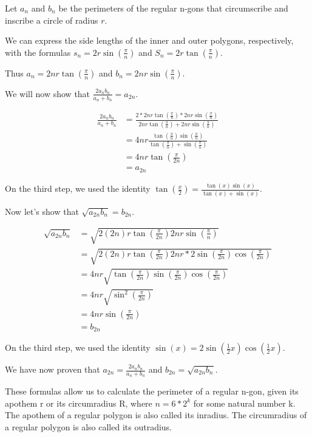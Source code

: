 Let $a_n$ and $b_n$ be the perimeters of the regular n-gons that circumscribe and inscribe a circle of radius $r$.

We can express the side lengths of the inner and outer polygons, respectively, with the formulas $s_n=2r\sin(\frac{\pi}{n})$ and $S_n = 2r\tan(\frac{\pi}{n})$.

Thus $a_n = 2nr\tan(\frac{\pi}{n})$ and $b_n = 2nr\sin(\frac{\pi}{n})$.

We will now show that $\frac{2a_nb_n}{a_n + b_n} = a_{2n}$.

\begin{align*}
\frac{2a_nb_n}{a_n + b_n} &= \frac{2*2nr\tan(\frac{\pi}{n})*2nr\sin(\frac{\pi}{n})}{2nr\tan(\frac{\pi}{n}) + 2nr\sin(\frac{\pi}{n})} \\
&= 4nr \frac{\tan(\frac{\pi}{n})\sin(\frac{\pi}{n})}{\tan(\frac{\pi}{n}) + \sin(\frac{\pi}{n})} \\
&= 4nr \tan(\frac{\pi}{2n}) \\
&= a_{2n}
\end{align*}

On the third step, we used the identity $\tan(\frac{x}{2}) = \frac{\tan(x)\sin(x)}{\tan(x) + \sin(x)}$.

Now let's show that $\sqrt{a_{2n}b_n} = b_{2n}$.

\begin{align*}
\sqrt{a_{2n}b_n} &= \sqrt{2(2n)r\tan(\frac{\pi}{2n}) 2nr\sin(\frac{\pi}{n})} \\
&= \sqrt{2(2n)r\tan(\frac{\pi}{2n}) 2nr * 2\sin(\frac{\pi}{2n})\cos(\frac{\pi}{2n})} \\
&= 4nr \sqrt{\tan(\frac{\pi}{2n}) \sin(\frac{\pi}{2n})\cos(\frac{\pi}{2n})} \\
&= 4nr \sqrt{\sin^2(\frac{\pi}{2n})} \\
&= 4nr \sin(\frac{\pi}{2n}) \\
&= b_{2n}
\end{align*}

On the third step, we used the identity $\sin(x) = 2\sin(\frac{1}{2}x)\cos(\frac{1}{2}x)$.

We have now proven that $a_{2n} = \frac{2a_nb_n}{a_n+b_n}$ and $b_{2n} = \sqrt{a_{2n}b_n}$.

These formulas allow us to calculate the perimeter of a regular n-gon, given its apothem r or its circumradius R, where $n = 6*2^k$ for some natural number k. The apothem of a regular polygon is also called its inradius. The circumradius of a regular polygon is also called its outradius.
